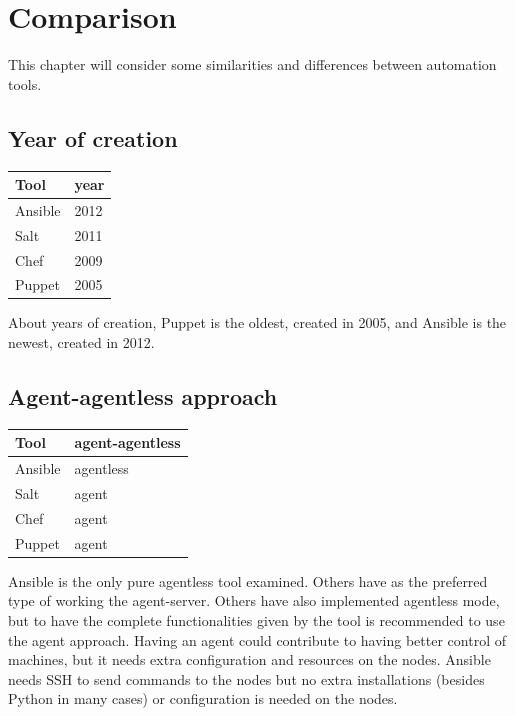 \documentclass[12pt,a4paper,openright,twoside]{book}
\begin{document}
\section{Comparison}
This chapter will consider some similarities and differences between automation tools.

\subsection{Year of creation}
\begin{table}[H]
    \begin{tabular}{|l|l|}
    \hline
    \textbf{Tool} & \textbf{year} \\ \hline
    Ansible       & 2012                   \\ \hline 
    Salt          & 2011                   \\ \hline
    Chef          & 2009                   \\ \hline
    Puppet        & 2005                   \\ \hline
    \end{tabular}
\end{table}
About years of creation, Puppet is the oldest, created in 2005, and Ansible is the newest, created in 2012.

\subsection{Agent-agentless approach}
\begin{table}[H]
    \begin{tabular}{|l|l|}
    \hline
    \textbf{Tool} & \textbf{agent-agentless} \\ \hline
    Ansible       & agentless                \\ \hline
    Salt          & agent                    \\ \hline
    Chef          & agent                    \\ \hline
    Puppet        & agent                    \\ \hline
    \end{tabular}
\end{table}
Ansible is the only pure agentless tool examined. Others have as the preferred type of working the agent-server.
Others have also implemented agentless mode, but to have the complete functionalities given by the tool is recommended to use the agent approach.
Having an agent could contribute to having better control of machines, but it needs extra configuration and resources on the nodes.
Ansible needs SSH to send commands to the nodes but no extra installations (besides Python in many cases) or configuration is needed on the nodes.
\end{document}
